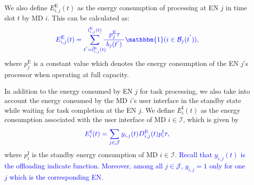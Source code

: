 \documentclass[10pt, journal,letterpaper]{IEEEtran}
\begin{document}
We also define $E_{i,j}^{\text{E}}(t)$ as the energy consumption of processing at EN $j$ in time slot $t$ by MD $i$. This can be calculated as:
\begin{alignat}{1}
	\textcolor{blue}{E_{i,j}^{\text{E}}(t) =  \sum_{t^{'}=\hat{l}_{i,j}^{\text{E}}(t)}^{l_{i,j}^{\text{E}}(t)}\hspace{-2mm}{\, p_j^{\text{E}} \tau \over \,\, b_j(t^{'})\,\,}\mathbbm{1}(i \in \mathcal{B}_j(t^{'})),}  
	\label{15}  
\end{alignat}
where $p_j^{\text{E}}$ is a constant value which denotes the energy consumption of the EN $j$'s processor when operating at full capacity. 

In addition to the energy consumed by EN $j$ for task processing, we also take into account the energy consumed by the MD $i$'s user interface in the standby state while waiting for task completion at the EN $j$. We define $E_{i}^{\text{I}}(t)$ as the energy consumption associated with the user interface of MD $i \in \mathcal{I}$, which is given by
\begin{alignat}{1}
		\textcolor{blue}{E_{i}^{\text{I}}(t) =  \sum_{j \in \mathcal{J}}y_{i,j}(t) D_{i,j}^{\text{E}}(t) p_i^{\text{I}} \tau, }
	\label{16}
\end{alignat}
where $p_i^{\text{I}}$ is the standby energy consumption of MD $i \in \mathcal{I}$.  \textcolor{blue}{Recall that $y_{i,j}(t)$ is the offloading indicate function. Moreover, among all $j \in \mathcal{J}$, $y_{i,j}=1$ only for one $j$ which is the corresponding EN.}

\end{document}
